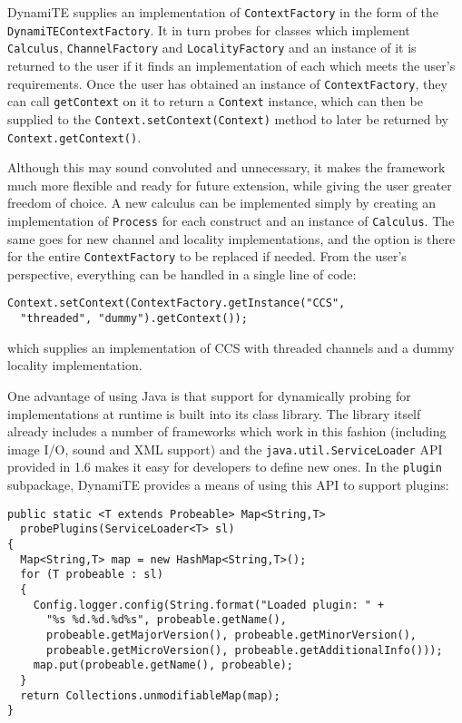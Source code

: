 DynamiTE supplies an implementation of \texttt{ContextFactory} in the
form of the\\ \texttt{DynamiTEContextFactory}.  It in turn probes for
classes which implement \texttt{Calculus}, \texttt{ChannelFactory} and
\texttt{LocalityFactory} and an instance of it is returned to the user
if it finds an implementation of each which meets the user's
requirements.  Once the user has obtained an instance of
\texttt{ContextFactory}, they can call \texttt{getContext} on it to
return a \texttt{Context} instance, which can then be supplied to the
\texttt{Context.setContext(Context)} method to later be returned by
\texttt{Context.getContext()}.

Although this may sound convoluted and unnecessary, it makes the
framework much more flexible and ready for future extension, while
giving the user greater freedom of choice.  A new calculus can be
implemented simply by creating an implementation of \texttt{Process}
for each construct and an instance of \texttt{Calculus}.  The same
goes for new channel and locality implementations, and the option is
there for the entire \texttt{ContextFactory} to be replaced if needed.
From the user's perspective, everything can be handled in a single
line of code:

\begin{verbatim}
Context.setContext(ContextFactory.getInstance("CCS",
  "threaded", "dummy").getContext());
\end{verbatim}

\noindent which supplies an implementation of CCS with threaded
channels and a dummy locality implementation.

One advantage of using Java is that support for dynamically probing
for implementations at runtime is built into its class library.  The
library itself already includes a number of frameworks which work in
this fashion (including image I/O, sound and XML support) and the
\texttt{java.util.ServiceLoader} API provided in 1.6 makes it easy for
developers to define new ones.  In the \texttt{plugin} subpackage,
DynamiTE provides a means of using this API to support plugins:

\begin{verbatim}
public static <T extends Probeable> Map<String,T>
  probePlugins(ServiceLoader<T> sl)
{
  Map<String,T> map = new HashMap<String,T>();
  for (T probeable : sl)
  {
    Config.logger.config(String.format("Loaded plugin: " +
      "%s %d.%d.%d%s", probeable.getName(),
      probeable.getMajorVersion(), probeable.getMinorVersion(),
      probeable.getMicroVersion(), probeable.getAdditionalInfo()));
    map.put(probeable.getName(), probeable);
  }
  return Collections.unmodifiableMap(map);
}
\end{verbatim}


